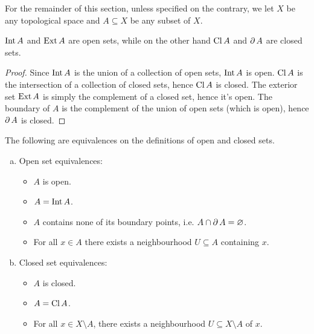 \begin{remark}
    For the remainder of this section, unless specified on the contrary, we let
    \(X\) be any topological space and \(A \subseteq X\) be any subset of \(X\).
\end{remark}

\begin{proposition}\label{prop:open-close-int-ext-closure-boundary}
    \(\operatorname{Int} A\) and \(\operatorname{Ext} A\) are open sets, while on the other hand \(\operatorname{Cl} A\)
    and \(\operatorname{\partial} A\) are closed sets.
\end{proposition}

\begin{proof}
    Since \(\operatorname{Int} A\) is the union of a collection of open sets, \(\operatorname{Int} A\) is
    open. \(\operatorname{Cl} A\) is the intersection of a collection of closed sets, hence
    \(\operatorname{Cl} A\) is closed. The exterior set \(\operatorname{Ext} A\) is simply the complement
    of a closed set, hence it's open. The boundary of \(A\) is the complement of the
    union of open sets (which is open), hence \(\operatorname{\partial} A\) is closed.
\end{proof}

\begin{proposition}
    \label{prop:equiv-open-and-closed-set}
    The following are equivalences on the definitions of open and closed sets.
    \begin{enumerate}[(a)]\setlength\itemsep{0em}
        \item Open set equivalences:
              \begin{itemize}\setlength\itemsep{0em}
                  \item \(A\) is open.

                  \item \(A = \operatorname{Int} A\).

                  \item \(A\) contains none of its boundary points, i.e. \(A \cap \operatorname{\partial} A =
                        \varnothing\).

                  \item For all \(x \in A\) there exists a neighbourhood \(U \subseteq A\)
                        containing \(x\).
              \end{itemize}

        \item Closed set equivalences:
              \begin{itemize}\setlength\itemsep{0em}
                  \item \(A\) is closed.

                  \item \(A = \operatorname{Cl} A\).

                  \item For all \(x \in X \setminus A\), there exists a neighbourhood \(U
                        \subseteq X \setminus A\) of \(x\).
              \end{itemize}
    \end{enumerate}
\end{proposition}

